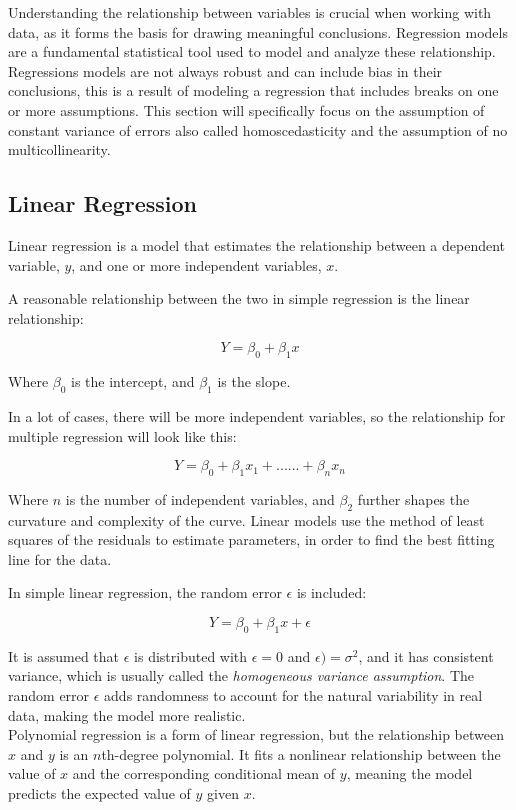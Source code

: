 Understanding the relationship between variables is crucial when working with data, as it forms the basis for drawing meaningful conclusions. Regression models are a fundamental statistical tool used to model and analyze these relationship. Regressions models are not always robust and can include bias in their conclusions, this is a result of modeling a regression that includes breaks on one or more assumptions. This section will specifically focus on the assumption of constant variance of errors also called homoscedasticity and the assumption of no multicollinearity.


\subsection{Linear Regression}
Linear regression is a model that estimates the relationship between a dependent variable, \( y \), and one or more independent variables, \( x \).

A reasonable relationship between the two in simple regression is the linear relationship:

\[
Y = \beta_0 + \beta_1 x
\]

Where \( \beta_0 \) is the intercept, and \( \beta_1 \) is the slope.

In a lot of cases, there will be more independent variables, so the relationship for multiple regression will look like this:

\[
Y = \beta_0 + \beta_1 x_1 + ......+ \beta_n x_n
\]



Where \( n \) is the number of independent variables, and $\beta_2$ further shapes the curvature and complexity of the curve. Linear models use the method of least squares of the residuals to estimate parameters, in order to find the best fitting line for the data.

In simple linear regression, the random error \( \epsilon \) is included:

\[
Y = \beta_0 + \beta_1 x + \epsilon
\]

It is assumed that \( \epsilon \) is distributed with $\epsilon = 0$ and $\epsilon) = \sigma^2$, and it has consistent variance, which is usually called the \textit{homogeneous variance assumption}. The random error \( \epsilon \) adds randomness to account for the natural variability in real data, making the model more realistic.
\newline\\
Polynomial regression is a form of linear regression, but the relationship between \( x \) and \( y \) is an \( n \)th-degree polynomial. It fits a nonlinear relationship between the value of \( x \) and the corresponding conditional mean of \( y \), meaning the model predicts the expected value of \( y \) given \( x \).

